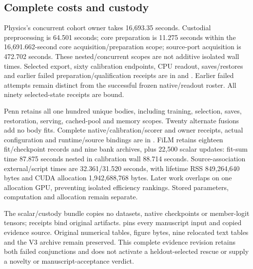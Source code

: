 \subsection{Complete costs and custody}\label{app:confirmation-costs-v5}


Physics's concurrent cohort owner takes 16,693.35 seconds. Custodial preprocessing is 64.501 seconds; core preparation is 11.275 seconds within the 16,691.662-second core acquisition/preparation scope; source-port acquisition is 472.702 seconds. These nested/concurrent scopes are not additive isolated wall times. Selected export, sixty calibration endpoints, CPU readout, saves/restores and earlier failed preparation/qualification receipts are in  and . Earlier failed attempts remain distinct from the successful frozen native/readout roster. All ninety selected-state receipts are bound.

Penn  retains all one hundred unique bodies, including training, selection, saves, restoration, serving, cached-pool and memory scopes. Twenty alternate fusions add no body fits. Complete native/calibration/scorer and owner receipts, actual configuration and runtime/source bindings are in . FiLM retains eighteen fit/checkpoint records and nine bank archives, plus 22,500 scalar updates: fit-sum time 87.875 seconds nested in calibration wall 88.714 seconds. Source-association external/script times are 32.361/31.520 seconds, with lifetime RSS 849,264,640 bytes and CUDA allocation 1,942,688,768 bytes. Later work overlaps on one allocation GPU, preventing isolated efficiency rankings. Stored parameters, computation and allocation remain separate.

The scalar/custody bundle copies no datasets, native checkpoints or member-logit tensors; receipts bind original artifacts.  pins every manuscript input and copied evidence source. Original numerical tables, figure bytes, nine relocated text tables and the V3 archive remain preserved. This complete evidence revision retains both failed conjunctions and does not activate a heldout-selected rescue or supply a novelty or manuscript-acceptance verdict.

